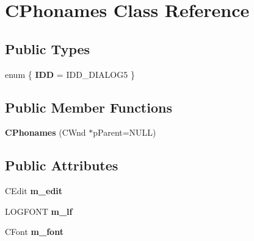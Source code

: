 \hypertarget{class_c_phonames}{\section{C\-Phonames Class Reference}
\label{class_c_phonames}
}
\subsection*{Public Types}
\begin{DoxyCompactItemize}
\item 
enum \{ {\bfseries I\-D\-D} =  I\-D\-D\-\_\-\-D\-I\-A\-L\-O\-G5
 \}
\end{DoxyCompactItemize}
\subsection*{Public Member Functions}
\begin{DoxyCompactItemize}
\item 
\hypertarget{class_c_phonames_ab37f645a71b4bb3d2850c5fa7b5414d9}{{\bfseries C\-Phonames} (C\-Wnd $\ast$p\-Parent=N\-U\-L\-L)}\label{class_c_phonames_ab37f645a71b4bb3d2850c5fa7b5414d9}

\end{DoxyCompactItemize}
\subsection*{Public Attributes}
\begin{DoxyCompactItemize}
\item 
\hypertarget{class_c_phonames_a47c884056eaec09c76765fb1a02f6620}{C\-Edit {\bfseries m\-\_\-edit}}\label{class_c_phonames_a47c884056eaec09c76765fb1a02f6620}

\item 
\hypertarget{class_c_phonames_a08e241f8fcc6a262e77ad7c44180e4df}{L\-O\-G\-F\-O\-N\-T {\bfseries m\-\_\-lf}}\label{class_c_phonames_a08e241f8fcc6a262e77ad7c44180e4df}

\item 
\hypertarget{class_c_phonames_a090e69825b6b7d770734d2e664c53f6a}{C\-Font {\bfseries m\-\_\-font}}\label{class_c_phonames_a090e69825b6b7d770734d2e664c53f6a}

\end{DoxyCompactItemize}
